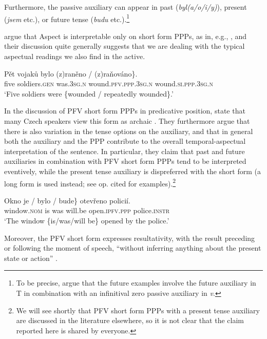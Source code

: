 \documentclass[output=paper,colorlinks,citecolor=brown]{langscibook}
\begin{document}
\noindent Furthermore, the passive auxiliary can appear in past (\textit{byl(a/o/i/y)}), present (\textit{jsem} etc.), or future tense (\textit{budu} etc.).\footnote{To be precise, \citet{veselovskakarlik} argue that the future examples involve the future auxiliary in T in combination with an infinitival zero passive auxiliary in \textit{v}.}

\citet{veselovskakarlik} argue that Aspect is interpretable only on short form PPPs, as in, e.g.,  \citep[adapted from][224]{veselovskakarlik}, and their discussion quite generally suggests that we are dealing with the typical aspectual readings we also find in the active.

\ea \label{ex:czpppasp}
\gll Pět vojaků bylo \minsp{\{} (z)raněno / (z)ra\v{n}ováno\}.\\
    five soldiers.\textsc{gen} was.\textsc{3sg.n} {} wound.\textsc{pfv.ppp.3sg.n} {} wound.\textsc{si.ppp.3sg.n}\\
\glt `Five soldiers were \{wounded / repeatedly wounded\}.'
\z

\noindent In the discussion of PFV short form PPPs in predicative position, \citet{veselovskakarlik} state that many Czech speakers view this form as archaic \citep[see also][96, for ``stative"-interpreted short form PPPs]{Biskup2019}. They furthermore argue that there is also variation in the tense options on the auxiliary, and that in general both the auxiliary and the PPP contribute to the overall temporal-aspectual interpretation of the sentence. In particular, they claim that past and future auxiliaries in combination with PFV short form PPPs tend to be interpreted eventively, while the present tense auxiliary is dispreferred with the short form  \citep[adapted from][225]{veselovskakarlik} (a long form is used instead; see op. cited for examples).\footnote{We will see shortly that PFV short form PPPs with a present tense auxiliary are discussed in the literature elsewhere, so it is not clear that the claim reported here is shared by everyone.}

\ea\label{ex:tenseppp}
\gll Okno  je / bylo / bude\} otevřeno policií.\\
window.\textsc{nom} {} is {} was {} will.be open.\textsc{ipfv.ppp} police.\textsc{instr}\\
\glt `The window \{is/was/will be\} opened by the police.'
\z 

\noindent Moreover, the PFV short form expresses resultativity, with the result preceding or following the moment of speech, ``without inferring anything about the present state or action''  \citep[adapted from][225]{veselovskakarlik}.
\end{document}
